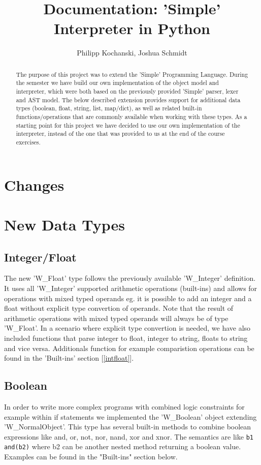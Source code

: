 \documentclass{article}
\begin{document}
\title{Documentation: 'Simple' Interpreter in Python}
\author{Philipp Kochanski, Joshua Schmidt}

\maketitle

\begin{abstract}
The purpose of this project was to extend the 'Simple' Programming Language.
During the semester we have build our own implementation of the object model and interpreter, which were both based
on the previously provided 'Simple' parser, lexer and AST model. The below described extension provides support for additional data types (boolean, float, string, list, map/dict), as well as related built-in functions/operations that are commonly available when working with these types. As a starting point for this project we have decided to use our own implementation of the interpreter, instead of the one that was provided to us at the end of the course exercises. 
\end{abstract}

\section{Changes}

\section{New Data Types}
\subsection{Integer/Float}
The new 'W\_Float' type follows the previously available 'W\_Integer' definition. It uses all 'W\_Integer' supported arithmetic operations (built-ins) and allows for operations with mixed typed operands eg. it is possible to add an integer and a float without explicit type convertion of operands. Note that the result of arithmetic operations with mixed typed operands will always be of type 'W\_Float'. In a scenario where explicit type convertion is needed, we have also included functions that parse integer to float, integer to string, floats to string and vice versa. Additionals function for example comparistion operations can be found in the 'Built-ins' section [\ref{intfloat}].

\subsection{Boolean}
In order to write more complex programs with combined logic constraints for example within if statements we implemented the 'W\_Boolean' object extending 'W\_NormalObject'.
This type has several built-in methods to combine boolean expressions like and, or, not, nor, nand, xor and xnor.
The semantics are like \texttt{b1 and(b2)} where b2 can be another nested method returning a boolean value. Examples can be found in the "Built-ins" section below.
\end{document}
